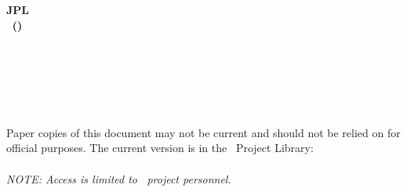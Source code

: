 %
%

\thispagestyle{empty}

\raggedright

{\Large\bfseries JPL \jpldoc}\\[\baselineskip]

{\LARGE\bfseries \missionfull $\,$ (\mission)}\\[2\baselineskip]

{\LARGE\bfseries \mission $\,$ \docname}\\[2\baselineskip]

\revision\\
\docdate\\[3\baselineskip]

\prepareAname\\
\prepareArole\\[2\baselineskip]

\prepareBname\\
\prepareBrole\\[6\baselineskip]

Paper copies of this document may not be current and should not be
relied on for official purposes. The current version is in the
\mission \, Project Library:\\
\href{\projectlibloc}{\projectlibloc}\\[1\baselineskip]
\textit{NOTE: Access is limited to \mission \, project personnel.}\\[2\baselineskip]

\nasajplbottom
\hrulefill
